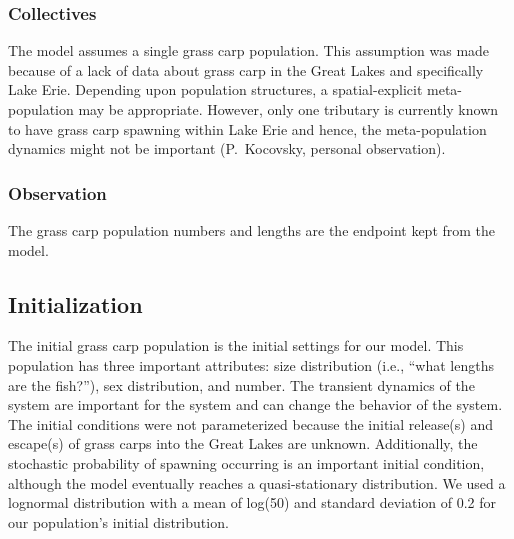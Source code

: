 \documentclass{article}[12pt]
\begin{document}
\subsubsection{Collectives}

The model assumes a single grass carp population. 
This assumption was made because of a lack of data about grass carp in the Great Lakes and specifically Lake Erie.  
Depending upon population structures, a spatial-explicit meta-population may be appropriate.
However, only one tributary is currently known to have grass carp spawning within Lake Erie and hence, the meta-population dynamics might not be important (P.~Kocovsky, personal observation).  


\subsubsection{Observation}

The grass carp population numbers and lengths are the endpoint kept from the model.  


\subsection{Initialization}\label{sec:init}

The initial grass carp population is the initial settings for our model.
This population has three important attributes: size distribution (i.e., ``what lengths are the fish?''), sex distribution, and number.
The transient dynamics of the system are important for the system and can change the behavior of the system.
The initial conditions were not parameterized because the initial release(s) and escape(s) of grass carps into the Great Lakes are unknown. 
Additionally, the stochastic probability of spawning occurring is an important initial condition, although the model eventually reaches a quasi-stationary distribution.  
We used a lognormal distribution with a mean of log(50) and standard deviation of 0.2 for our population's initial distribution. 
\end{document}
